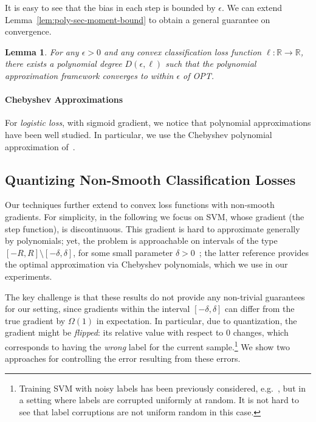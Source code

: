 \documentclass{article}
\newcommand{\R}{\mathbb{R}}
\newtheorem{lemma}{Lemma}
\begin{document}
\vspace{-0.5em}
It is easy to see that the bias in each step is bounded by $\epsilon$. 
We can extend Lemma~\ref{lem:poly-sec-moment-bound} to obtain a general guarantee on convergence. 

\begin{lemma}
	For any $\epsilon > 0$ and any convex classification loss function $\ell: \R \rightarrow \R$, there exists a polynomial degree $D(\epsilon, \ell)$ such that the polynomial approximation framework converges to within $\epsilon$ of OPT.  
\end{lemma}

\vspace{-1.5em}
\paragraph{Chebyshev Approximations} 
For \emph{logistic loss}, with sigmoid gradient, we notice that polynomial approximations have been well studied. In particular, we use the Chebyshev polynomial approximation of~\cite{vlcek2012chebyshev}. 

\vspace{-1em}
\subsection{Quantizing Non-Smooth Classification Losses}
\vspace{-0.5em}

Our techniques further extend to convex loss functions with non-smooth gradients.  
For simplicity, in the following we focus on SVM, whose gradient (the step function), is discontinuous. 
This gradient is hard to approximate generally by polynomials; yet, the problem is approachable on intervals of the type $[-R, R] \setminus [-\delta, \delta]$, for some small parameter $\delta > 0$~\cite{frostig2016principal, allen2016faster}; the latter reference provides the optimal approximation via Chebyshev polynomials, which we use in our experiments. 

The key challenge is that these results do not provide any non-trivial guarantees for our setting, since gradients within the interval $[-\delta, \delta]$ can differ from the true gradient by $\Omega (1)$ in expectation. In particular, due to quantization, the gradient might be \emph{flipped}: 
its relative value with respect to $0$ changes, which corresponds to having the \emph{wrong} label for the current sample.\footnote{Training SVM with noisy labels has been previously considered, e.g.~\cite{Natarajan:2013:NIPS}, but in a setting where labels are corrupted uniformly at random. It is not hard to see that label corruptions are not uniform random in this case.}
We show two approaches for controlling the error resulting from these errors. 
\end{document}
